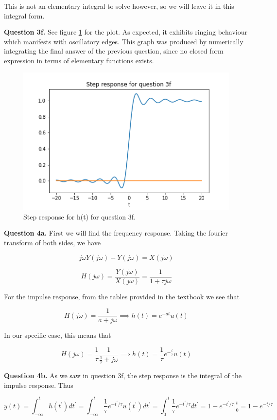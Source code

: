 \documentclass[letterpaper, reqno,11pt]{article}
\begin{document}
This is not an elementary integral to solve however, so we will leave it in this integral form. 

{\noindent\bf Question 3f.} See figure \ref{fig:q3f} for the plot. As expected, it exhibits ringing behaviour which manifests with oscillatory edges. This graph was produced by numerically integrating the final answer of the previous question, since no closed form expression in terms of elementary functions exists. 

\begin{figure}[htbp]
\centering
\includegraphics[width=\textwidth]{q3f}
\caption{Step response for h(t) for question 3f. }
\label{fig:q3f}
\end{figure}

{\noindent\bf Question 4a.} First we will find the frequency response. Taking the fourier transform of both sides, we have 

\[
    j\omega Y(j\omega)+Y(j\omega)=X(j\omega)
\]

\[
    H(j\omega)=\frac{Y(j\omega)}{X(j\omega)} = \frac1{1+\tau j\omega}
\]

For the impulse response, from the tables provided in the textbook we see that 

\[
    H(j\omega)=\frac1{a+j\omega}\implies h(t)=e^{-at}u(t)
\]

In our specific case, this means that 

\[
    H(j\omega)=\frac1\tau\frac1{\frac1\tau+j\omega}\implies h(t)=\frac1\tau e^{-\frac t\tau}u(t)
\]

{\noindent\bf Question 4b.} As we saw in question 3f, the step response is the integral of the impulse response. Thus 

\[
    y(t)=\int_{-\infty}^t h(t^\prime)dt^\prime=\int_{-\infty}^t\frac1\tau e^{-t^\prime/\tau}u(t^\prime)dt^\prime=\int_{0}^t\frac1\tau e^{-t^\prime/\tau}dt^\prime=1-e^{-t^\prime/\tau}\bigg|_0^t=1-e^{-t/\tau}
\]
\end{document}
